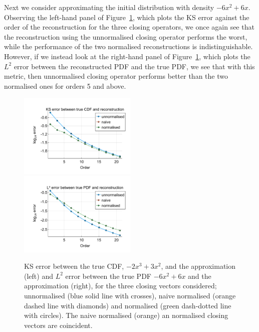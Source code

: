 Next we consider approximating the initial distribution with density \(-6x^2+6x\). Observing the left-hand panel of Figure~\ref{fig: fun 6 ks error qbdrap closing vecs}, which plots the KS error against the order of the reconstruction for the three closing operators, we once again see that the reconstruction using the unnormalised closing operator performs the worst, while the performance of the two normalised reconstructions is indistinguishable. However, if we instead look at the right-hand panel of Figure~\ref{fig: fun 6 ks error qbdrap closing vecs}, which plots the \(L^2\) error between the reconstructed PDF and the true PDF, we see that with this metric, then unnormalised closing operator performs better than the two normalised ones for orders 5 and above. 
\begin{figure}
	\centering
	\includegraphics[width=0.5\textwidth,trim={1.25cm 0.8cm 0.25cm 1.25cm},clip]{chapter5/figs/qbdrap_closing_vec/fun6/ks_error_formatted.pdf}%
	\includegraphics[width=0.5\textwidth,trim={1.25cm 0.8cm 0.25cm 1.25cm},clip]{chapter5/figs/qbdrap_closing_vec/fun6/l2_pdf_error_formatted.pdf}
	\caption{KS error between the true CDF, \(-2x^3+3x^2\), and the approximation (left) and \(L^2\) error between the true PDF \(-6x^2+6x\) and the approximation (right), for the three closing vectors considered; unnormalised (blue solid line with crosses), naive normalised (orange dashed line with diamonds) and normalised (green dash-dotted line with circles). The naive normalised (orange) an normalised closing vectors are coincident.}
	\label{fig: fun 6 ks error qbdrap closing vecs}
\end{figure}

